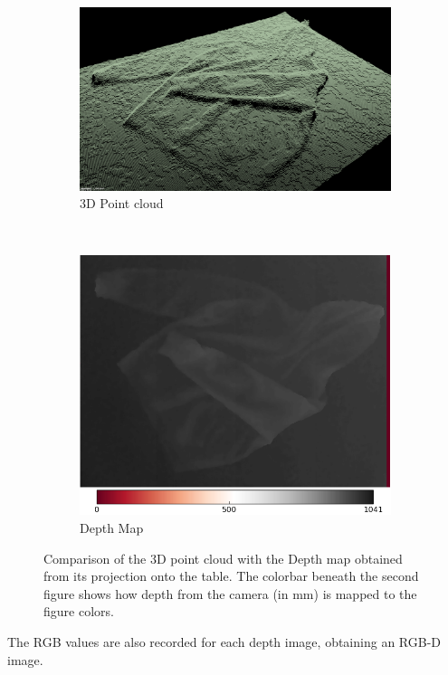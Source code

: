 \begin{figure}[htbp]
	\centering
    \begin{subfigure}[l]{0.49\textwidth}
	    \centering
    	\includegraphics[width=\textwidth]
    	{figures/point-cloud-01.png}
    	\caption{3D Point cloud}
	\end{subfigure}
	~
    \begin{subfigure}[r]{0.49\textwidth}
	    \centering
    	\includegraphics[width=\textwidth]
    	{figures/point-cloud-projection-2.png}
    	\caption{Depth Map}
	\end{subfigure}
    \caption[Comparison of the 3D point cloud with the Depth map obtained from its projection onto the table.]
    {Comparison of the 3D point cloud with the Depth map obtained from its projection onto the table. The colorbar beneath the second figure shows how depth from the camera (in mm) is mapped to the figure colors.}
    \label{fig:point_cloud_and_depth_image}
\end{figure}

The RGB values are also recorded for each depth image, obtaining an RGB-D image.

